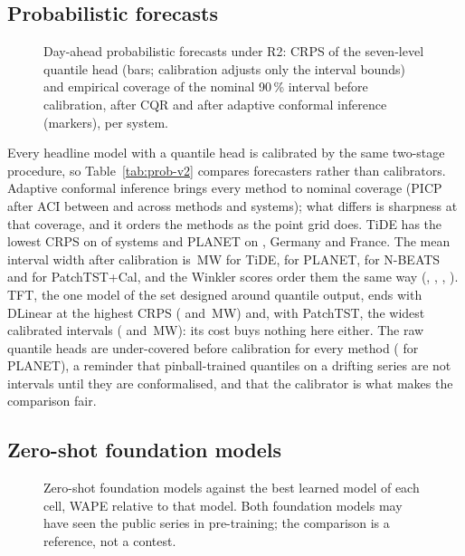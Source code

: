 \subsection{Probabilistic forecasts}
\label{sec:prob-results}
\begin{figure}[!t]
\centering
{}
\caption{Day-ahead probabilistic forecasts under R2: CRPS of the seven-level quantile head
(bars; calibration adjusts only the interval bounds) and empirical coverage of the nominal
90\,\% interval before calibration, after CQR and after adaptive conformal inference
(markers), per system.}
\label{fig:prob}
\end{figure}

Every headline model with a quantile head is calibrated by the same two-stage procedure, so
Table~\ref{tab:prob-v2} compares forecasters rather than calibrators. Adaptive conformal
inference brings every method to nominal coverage (PICP after ACI between
 and  across methods and systems); what
differs is sharpness at that coverage, and it orders the methods as the point grid does. TiDE
has the lowest CRPS on  of  systems and
PLANET on , Germany and France. The mean interval width after
calibration is \,MW for TiDE,
 for PLANET,  for
N-BEATS and  for PatchTST+Cal, and the Winkler scores order
them the same way (, ,
, ). TFT, the one
model of the set designed around quantile output, ends with DLinear at the highest CRPS
( and \,MW) and, with
PatchTST, the widest calibrated intervals ( and
\,MW): its cost buys nothing here either. The raw
quantile heads are under-covered before calibration for every method
( for PLANET), a reminder that pinball-trained quantiles on
a drifting series are not intervals until they are conformalised, and that the calibrator is
what makes the comparison fair.

\subsection{Zero-shot foundation models}
\label{sec:fm}
\begin{figure}[!t]
\centering
{}
\caption{Zero-shot foundation models against the best learned model of each cell, WAPE
relative to that model. Both foundation models may have seen the public series in
pre-training; the comparison is a reference, not a contest.}
\label{fig:fm}
\end{figure}

